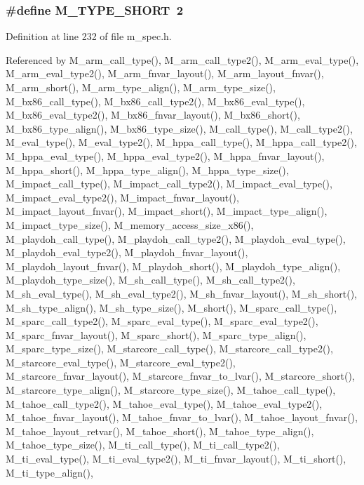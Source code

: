 \subsubsection{\setlength{\rightskip}{0pt plus 5cm}\#define M\_\-TYPE\_\-SHORT~2}\label{m__spec_8h_302eab9a7a8f8b4c54f6e91f23b987f6}




Definition at line 232 of file m\_\-spec.h.

Referenced by M\_\-arm\_\-call\_\-type(), M\_\-arm\_\-call\_\-type2(), M\_\-arm\_\-eval\_\-type(), M\_\-arm\_\-eval\_\-type2(), M\_\-arm\_\-fnvar\_\-layout(), M\_\-arm\_\-layout\_\-fnvar(), M\_\-arm\_\-short(), M\_\-arm\_\-type\_\-align(), M\_\-arm\_\-type\_\-size(), M\_\-bx86\_\-call\_\-type(), M\_\-bx86\_\-call\_\-type2(), M\_\-bx86\_\-eval\_\-type(), M\_\-bx86\_\-eval\_\-type2(), M\_\-bx86\_\-fnvar\_\-layout(), M\_\-bx86\_\-short(), M\_\-bx86\_\-type\_\-align(), M\_\-bx86\_\-type\_\-size(), M\_\-call\_\-type(), M\_\-call\_\-type2(), M\_\-eval\_\-type(), M\_\-eval\_\-type2(), M\_\-hppa\_\-call\_\-type(), M\_\-hppa\_\-call\_\-type2(), M\_\-hppa\_\-eval\_\-type(), M\_\-hppa\_\-eval\_\-type2(), M\_\-hppa\_\-fnvar\_\-layout(), M\_\-hppa\_\-short(), M\_\-hppa\_\-type\_\-align(), M\_\-hppa\_\-type\_\-size(), M\_\-impact\_\-call\_\-type(), M\_\-impact\_\-call\_\-type2(), M\_\-impact\_\-eval\_\-type(), M\_\-impact\_\-eval\_\-type2(), M\_\-impact\_\-fnvar\_\-layout(), M\_\-impact\_\-layout\_\-fnvar(), M\_\-impact\_\-short(), M\_\-impact\_\-type\_\-align(), M\_\-impact\_\-type\_\-size(), M\_\-memory\_\-access\_\-size\_\-x86(), M\_\-playdoh\_\-call\_\-type(), M\_\-playdoh\_\-call\_\-type2(), M\_\-playdoh\_\-eval\_\-type(), M\_\-playdoh\_\-eval\_\-type2(), M\_\-playdoh\_\-fnvar\_\-layout(), M\_\-playdoh\_\-layout\_\-fnvar(), M\_\-playdoh\_\-short(), M\_\-playdoh\_\-type\_\-align(), M\_\-playdoh\_\-type\_\-size(), M\_\-sh\_\-call\_\-type(), M\_\-sh\_\-call\_\-type2(), M\_\-sh\_\-eval\_\-type(), M\_\-sh\_\-eval\_\-type2(), M\_\-sh\_\-fnvar\_\-layout(), M\_\-sh\_\-short(), M\_\-sh\_\-type\_\-align(), M\_\-sh\_\-type\_\-size(), M\_\-short(), M\_\-sparc\_\-call\_\-type(), M\_\-sparc\_\-call\_\-type2(), M\_\-sparc\_\-eval\_\-type(), M\_\-sparc\_\-eval\_\-type2(), M\_\-sparc\_\-fnvar\_\-layout(), M\_\-sparc\_\-short(), M\_\-sparc\_\-type\_\-align(), M\_\-sparc\_\-type\_\-size(), M\_\-starcore\_\-call\_\-type(), M\_\-starcore\_\-call\_\-type2(), M\_\-starcore\_\-eval\_\-type(), M\_\-starcore\_\-eval\_\-type2(), M\_\-starcore\_\-fnvar\_\-layout(), M\_\-starcore\_\-fnvar\_\-to\_\-lvar(), M\_\-starcore\_\-short(), M\_\-starcore\_\-type\_\-align(), M\_\-starcore\_\-type\_\-size(), M\_\-tahoe\_\-call\_\-type(), M\_\-tahoe\_\-call\_\-type2(), M\_\-tahoe\_\-eval\_\-type(), M\_\-tahoe\_\-eval\_\-type2(), M\_\-tahoe\_\-fnvar\_\-layout(), M\_\-tahoe\_\-fnvar\_\-to\_\-lvar(), M\_\-tahoe\_\-layout\_\-fnvar(), M\_\-tahoe\_\-layout\_\-retvar(), M\_\-tahoe\_\-short(), M\_\-tahoe\_\-type\_\-align(), M\_\-tahoe\_\-type\_\-size(), M\_\-ti\_\-call\_\-type(), M\_\-ti\_\-call\_\-type2(), M\_\-ti\_\-eval\_\-type(), M\_\-ti\_\-eval\_\-type2(), M\_\-ti\_\-fnvar\_\-layout(), M\_\-ti\_\-short(), M\_\-ti\_\-type\_\-align(), 